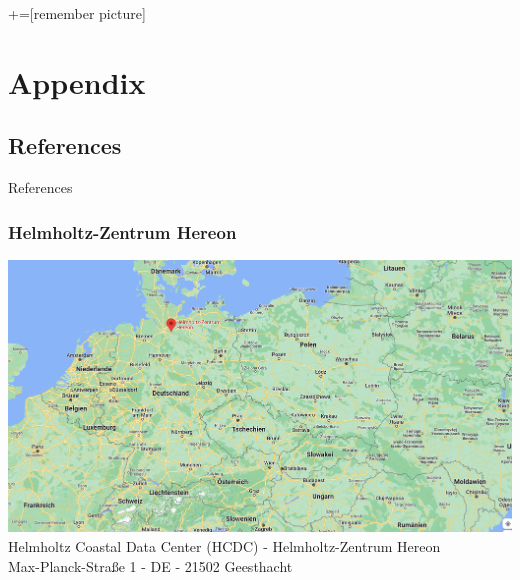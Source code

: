 \documentclass[17pt, table, compress]{beamer}
\title{\presentationtitle}
\subtitle{\presentationsubtitle}
\date{\presentationdate}
\author{\presentationauthor}
\begin{document}
+=[remember picture]


%
%











\appendix

\section{Appendix}
\subsection{References}
\begin{frame}[allowframebreaks]{References}{}



\end{frame}

\begin{frame}
\frametitle[Hereon]{Helmholtz-Zentrum Hereon}
\label{frm:map}
\includegraphics[height=0.7\textheight]{figures/hereon-map.png}  \\
Helmholtz Coastal Data Center (HCDC) - Helmholtz-Zentrum Hereon \\
Max-Planck-Straße 1 - DE - 21502 Geesthacht \\
\end{frame}
\end{document}
